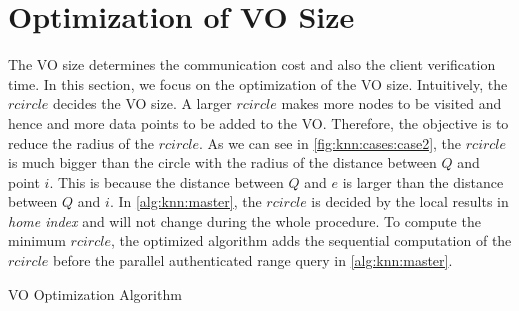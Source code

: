 \section{Optimization of VO Size}\label{sec:knn:opt}

The VO size determines the communication cost and also the client verification time. In this section, we focus on the optimization of the VO size. Intuitively, the $rcircle$ decides the VO size. A larger $rcircle$ makes more nodes to be visited and hence and more data points to be added to the VO\@. Therefore, the objective is to reduce the radius of the $rcircle$. As we can see in \cref{fig:knn:cases:case2}, the $rcircle$ is much bigger than the circle with the radius of the distance between $Q$ and point $i$. This is because the distance between $Q$ and $e$ is larger than the distance between $Q$ and $i$. In \cref{alg:knn:master}, the $rcircle$ is decided by the local results in \emph{home index} and will not change during the whole procedure. To compute the minimum $rcircle$, the optimized algorithm adds the sequential computation of the $rcircle$ before the parallel authenticated range query in \cref{alg:knn:master}.

\begin{algorithm}[t]
  \caption{VO Optimization Algorithm}\label{alg:knn:opt}
\end{algorithm}

